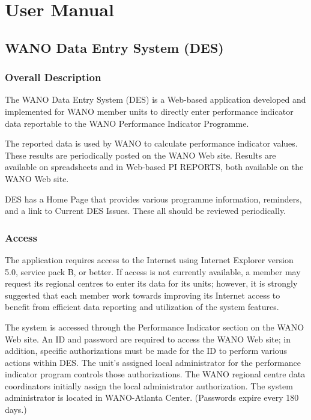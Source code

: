 \section{User Manual}
\subsection{WANO Data Entry System (DES)}

\subsubsection{Overall Description}

The WANO Data Entry System (DES) is a Web-based application developed and implemented for WANO member units to directly enter performance indicator data reportable to the WANO Performance Indicator Programme.

The reported data is used by WANO to calculate performance indicator values.  These results are periodically posted on the WANO Web site. Results are available on spreadsheets and in Web-based PI REPORTS, both available on the WANO Web site.

DES has a Home Page that provides various programme information, reminders, and a link to Current DES Issues. These all should be reviewed periodically.

\subsubsection{Access}

The application requires access to the Internet using Internet Explorer version 5.0, service pack B, or better. If access is not currently available, a member may request its regional centres to enter its data for its units; however, it is strongly suggested that each member work towards improving its Internet access to benefit from efficient data reporting and utilization of the system features.

The system is accessed through the Performance Indicator section on the WANO Web site.  An ID and password are required to access the WANO Web site; in addition, specific authorizations must be made for the ID to perform various actions within DES. The unit’s assigned local administrator for the performance indicator program controls those authorizations.  The WANO regional centre data coordinators initially assign the local administrator authorization. The system administrator is located in WANO-Atlanta Center. (Passwords expire every 180 days.)

